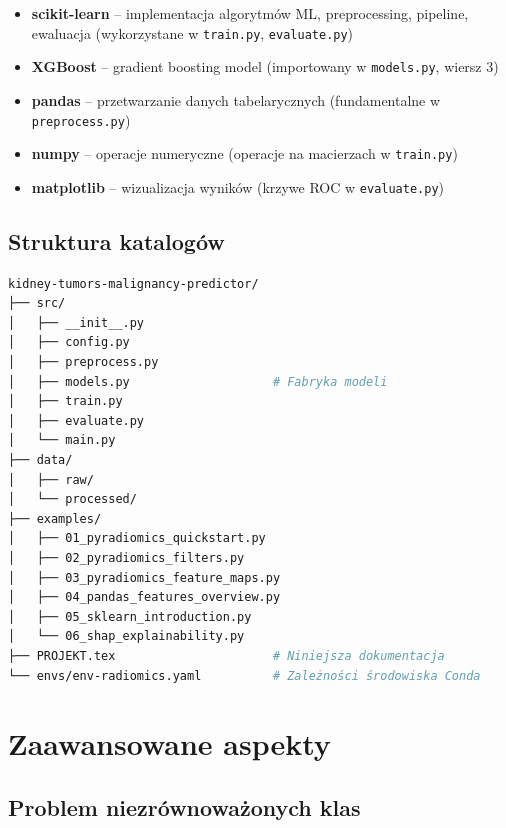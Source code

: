 \documentclass[12pt]{article}
\begin{document}
\begin{itemize}
    \item \textbf{scikit-learn} – implementacja algorytmów ML, preprocessing, pipeline, ewaluacja (wykorzystane w \texttt{train.py}, \texttt{evaluate.py})
    \item \textbf{XGBoost} – gradient boosting model (importowany w \texttt{models.py}, wiersz 3)
    \item \textbf{pandas} – przetwarzanie danych tabelarycznych (fundamentalne w \texttt{preprocess.py})
    \item \textbf{numpy} – operacje numeryczne (operacje na macierzach w \texttt{train.py})
    \item \textbf{matplotlib} – wizualizacja wyników (krzywe ROC w \texttt{evaluate.py})
\end{itemize}

\subsection{Struktura katalogów}

\begin{lstlisting}[language=bash, caption=Hierarchia plików projektu]
kidney-tumors-malignancy-predictor/
├── src/
│   ├── __init__.py               
│   ├── config.py                  
│   ├── preprocess.py                
│   ├── models.py                    # Fabryka modeli 
│   ├── train.py                     
│   ├── evaluate.py                  
│   └── main.py                      
├── data/
│   ├── raw/                         
│   └── processed/                  
├── examples/                       
│   ├── 01_pyradiomics_quickstart.py
│   ├── 02_pyradiomics_filters.py
│   ├── 03_pyradiomics_feature_maps.py
│   ├── 04_pandas_features_overview.py
│   ├── 05_sklearn_introduction.py
│   └── 06_shap_explainability.py
├── PROJEKT.tex                      # Niniejsza dokumentacja
└── envs/env-radiomics.yaml          # Zależności środowiska Conda
\end{lstlisting}

\section{Zaawansowane aspekty}

\subsection{Problem niezrównoważonych klas}
\end{document}
